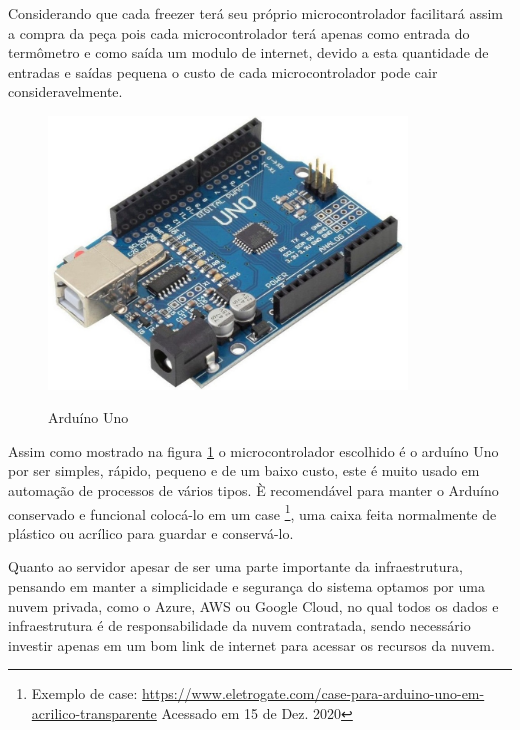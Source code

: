     Considerando que cada freezer terá seu próprio microcontrolador
    facilitará assim a compra da peça pois cada microcontrolador 
    terá apenas como entrada do termômetro
    e como saída um modulo de internet, 
    devido a esta quantidade de entradas e saídas pequena o custo
    de cada microcontrolador pode cair consideravelmente.

    \begin{figure}[ht]
        \caption{Arduíno Uno}
        \centering
        \includegraphics[width=0.85\textwidth]{img/arduino_uno.jpg}
        \label{fig:arduinoUno}
    \end{figure}


    Assim como mostrado na figura \ref{fig:arduinoUno}
    o microcontrolador escolhido é o arduíno Uno
    por ser simples, rápido, pequeno e de um baixo custo,
    este é muito usado em automação de processos
    de vários tipos. È recomendável para manter o 
    Arduíno conservado e funcional colocá-lo em um case
    \footnote{
        Exemplo de case: \url{https://www.eletrogate.com/case-para-arduino-uno-em-acrilico-transparente}
        Acessado em 15 de Dez. 2020
    },
    uma caixa feita normalmente de plástico ou acrílico 
    para guardar e conservá-lo.

    Quanto ao servidor apesar de ser uma parte importante 
    da infraestrutura, pensando em manter a simplicidade 
    e segurança do sistema optamos por uma nuvem privada,
    como o Azure, AWS ou Google Cloud, no qual todos os 
    dados e infraestrutura é de responsabilidade da 
    nuvem contratada, sendo necessário investir apenas 
    em um bom link de internet para acessar os recursos 
    da nuvem.

